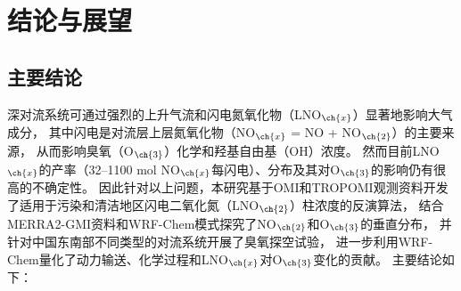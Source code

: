 
\chapter{结论与展望}

\section{主要结论}

深对流系统可通过强烈的上升气流和闪电氮氧化物（LNO$_{\ch{x}}$）显著地影响大气成分，
其中闪电是对流层上层氮氧化物（NO$_{\ch{x}}$ = NO + NO$_{\ch{2}}$）的主要来源，
从而影响臭氧（O$_{\ch{3}}$）化学和羟基自由基（OH）浓度。
然而目前LNO$_{\ch{x}}$的产率（32--1100 mol NO$_{\ch{x}}$每闪电）、分布及其对O$_{\ch{3}}$的影响仍有很高的不确定性。
因此针对以上问题，本研究基于OMI和TROPOMI观测资料开发了适用于污染和清洁地区闪电二氧化氮（LNO$_{\ch{2}}$）柱浓度的反演算法，
结合MERRA2-GMI资料和WRF-Chem模式探究了NO$_{\ch{2}}$和O$_{\ch{3}}$的垂直分布，
并针对中国东南部不同类型的对流系统开展了臭氧探空试验，
进一步利用WRF-Chem量化了动力输送、化学过程和LNO$_{\ch{x}}$对O$_{\ch{3}}$变化的贡献。
主要结论如下：

